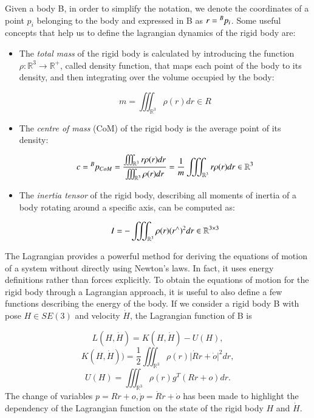 Given a body B, in order to simplify the notation, we denote the coordinates of a point $p_i$ belonging to the body and expressed in B as $r = {}^{B}{p}_{i}$. 
Some useful concepts that help us to define the lagrangian dynamics of the rigid body are:
\begin{itemize}
    \item The \textit{total mass} of the rigid body is calculated by introducing the function $\rho: \mathbb{R}^3 \longrightarrow \mathbb{R}^+$, called density function, that maps each point of the body to its density, and then integrating over the volume occupied by the body:

    \[
    m = \iiint_{\mathbb{R}^3} \rho(r)dr \in R
    \]

    \item The \textit{centre of mass} (CoM) of the rigid body is the average point of its density:

    \begin{equation}\label{centre_of_mass_rigid_body}
        c = {}^{B}{p}_{CoM} = \frac{\iiint_{\mathbb{R}^3} r\rho(r)dr }{\iiint_{\mathbb{R}^3} \rho(r)dr} = \frac{1}{m} \iiint_{\mathbb{R}^3} r\rho(r)dr \in \mathbb{R}^{3}
    \end{equation}

    \item The \textit{inertia tensor} of the rigid body, describing all moments of inertia of a body rotating around a specific axis, can be computed as:

    \begin{equation}\label{inertia_tensor_rigid_body}
        I = - \iiint_{\mathbb{R}^3} \rho(r)(r^{\wedge})^2 dr \in \mathbb{R}^{3\times3}
    \end{equation}
\end{itemize}


The Lagrangian provides a powerful method for deriving the equations of motion of a system without directly using Newton’s laws. In fact, it uses energy definitions rather than forces explicitly.
To obtain the equations of motion for the rigid body through a Lagrangian approach, it is useful to also define a few functions describing the energy of the body. If we consider a rigid body B with pose $H \in SE(3)$ and velocity $\dot{H}$, the Lagrangian function of B is

\begin{equation}\label{def_lagrangian_rb}
    L(H,\dot{H}) = K(H,\dot{H}) - U(H),
\end{equation}
\begin{equation}\label{def_kinetic_energy}
    K(H, \dot{H})) = \frac{1}{2} \iiint_{\mathbb{R}^3} \rho(r) \Big| \dot{R}r + \dot{o} \Big|^2 dr,
\end{equation}
\begin{equation} \label{def_potential_energy}
    U(H) = \iiint_{\mathbb{R}^3} \rho(r)g^T (Rr + o) dr.
\end{equation}
The change of variables $p = Rr + o, \dot{p} = \dot{R}r + \dot{o}$ has been made to highlight the dependency of the Lagrangian function on the state of the rigid body $H$ and $\dot{H}$.

